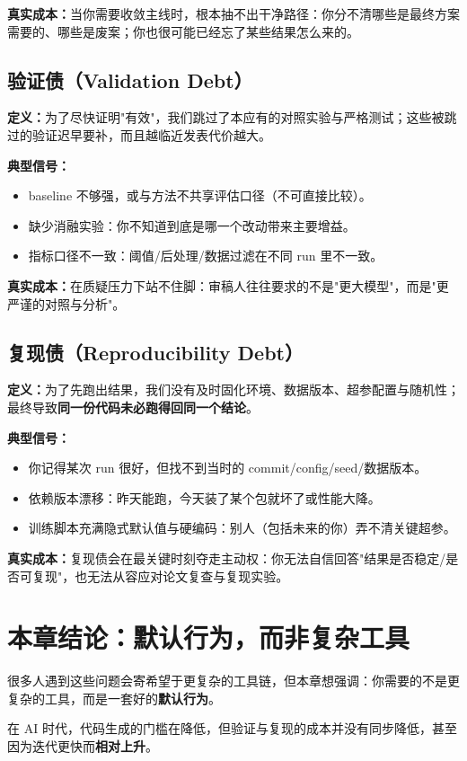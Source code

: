 \textbf{真实成本：}当你需要收敛主线时，根本抽不出干净路径：你分不清哪些是最终方案需要的、哪些是废案；你也很可能已经忘了某些结果怎么来的。

\subsection{验证债（Validation Debt）}
\textbf{定义：}为了尽快证明"有效"，我们跳过了本应有的对照实验与严格测试；这些被跳过的验证迟早要补，而且越临近发表代价越大。

\textbf{典型信号：}
\begin{itemize}
  \item baseline 不够强，或与方法不共享评估口径（不可直接比较）。
  \item 缺少消融实验：你不知道到底是哪一个改动带来主要增益。
  \item 指标口径不一致：阈值/后处理/数据过滤在不同 run 里不一致。
\end{itemize}

\textbf{真实成本：}在质疑压力下站不住脚：审稿人往往要求的不是"更大模型"，而是"更严谨的对照与分析"。

\subsection{复现债（Reproducibility Debt）}
\textbf{定义：}为了先跑出结果，我们没有及时固化环境、数据版本、超参配置与随机性；最终导致\textbf{同一份代码未必跑得回同一个结论}。

\textbf{典型信号：}
\begin{itemize}
  \item 你记得某次 run 很好，但找不到当时的 commit/config/seed/数据版本。
  \item 依赖版本漂移：昨天能跑，今天装了某个包就坏了或性能大降。
  \item 训练脚本充满隐式默认值与硬编码：别人（包括未来的你）弄不清关键超参。
\end{itemize}

\textbf{真实成本：}复现债会在最关键时刻夺走主动权：你无法自信回答"结果是否稳定/是否可复现"，也无法从容应对论文复查与复现实验。

\section{本章结论：默认行为，而非复杂工具}
很多人遇到这些问题会寄希望于更复杂的工具链，但本章想强调：你需要的不是更复杂的工具，而是一套好的\textbf{默认行为}。

在 AI 时代，代码生成的门槛在降低，但验证与复现的成本并没有同步降低，甚至因为迭代更快而\textbf{相对上升}。

